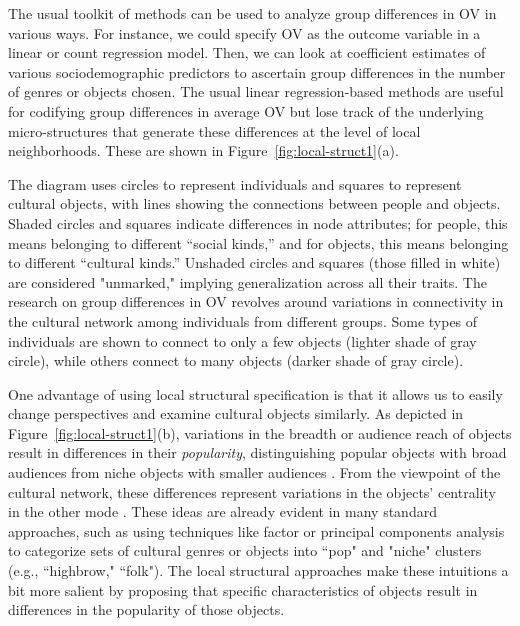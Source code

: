 \documentclass[preprint,12pt,authoryear]{elsarticle}
\begin{document}
The usual toolkit of methods can be used to analyze group differences in OV in various ways. For instance, we could specify OV as the outcome variable in a linear or count regression model. Then, we can look at coefficient estimates of various sociodemographic predictors to ascertain group differences in the number of genres or objects chosen. The usual linear regression-based methods are useful for codifying group differences in average OV but lose track of the underlying micro-structures that generate these differences at the level of local neighborhoods. These are shown in Figure~\ref{fig:local-struct1}(a). 

The diagram uses circles to represent individuals and squares to represent cultural objects, with lines showing the connections between people and objects. Shaded circles and squares indicate differences in node attributes; for people, this means belonging to different ``social kinds,'' and for objects, this means belonging to different ``cultural kinds.'' Unshaded circles and squares (those filled in white) are considered "unmarked," implying generalization across all their traits. The research on group differences in OV revolves around variations in connectivity in the cultural network among individuals from different groups. Some types of individuals are shown to connect to only a few objects (lighter shade of gray circle), while others connect to many objects (darker shade of gray circle).

One advantage of using local structural specification is that it allows us to easily change perspectives and examine cultural objects similarly. As depicted in Figure~\ref{fig:local-struct1}(b), variations in the breadth or audience reach of objects result in differences in their \textit{popularity}, distinguishing popular objects with broad audiences from niche objects with smaller audiences \citep{lizardo2018mutual}. From the viewpoint of the cultural network, these differences represent variations in the objects' centrality in the other mode \citep{faust1997centrality}. These ideas are already evident in many standard approaches, such as using techniques like factor or principal components analysis to categorize sets of cultural genres or objects into ``pop" and "niche" clusters (e.g., ``highbrow," ``folk"). The local structural approaches make these intuitions a bit more salient by proposing that specific characteristics of objects result in differences in the popularity of those objects. 
\end{document}
